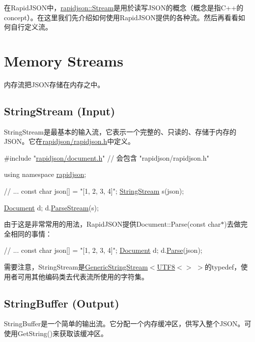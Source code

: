 在\+Rapid\+J\+S\+O\+N中，{\ttfamily \hyperlink{classrapidjson_1_1_stream}{rapidjson\+::\+Stream}}是用於读写\+J\+S\+O\+N的概念（概念是指\+C++的concept）。在这里我们先介绍如何使用\+Rapid\+J\+S\+O\+N提供的各种流。然后再看看如何自行定义流。\hypertarget{md_Commun_Externe_RapidJSON_doc_stream.zh-cn_MemoryStreams}{}\section{Memory Streams}\label{md_Commun_Externe_RapidJSON_doc_stream.zh-cn_MemoryStreams}
内存流把\+J\+S\+O\+N存储在内存之中。\hypertarget{md_Commun_Externe_RapidJSON_doc_stream.zh-cn_StringStream}{}\subsection{String\+Stream (\+Input)}\label{md_Commun_Externe_RapidJSON_doc_stream.zh-cn_StringStream}
{\ttfamily String\+Stream}是最基本的输入流，它表示一个完整的、只读的、存储于内存的\+J\+S\+O\+N。它在{\ttfamily \hyperlink{rapidjson_8h}{rapidjson/rapidjson.\+h}}中定义。


\begin{DoxyCode}
\textcolor{preprocessor}{#include "\hyperlink{document_8h}{rapidjson/document.h}"} \textcolor{comment}{// 会包含 "rapidjson/rapidjson.h"}

\textcolor{keyword}{using namespace }\hyperlink{namespacerapidjson}{rapidjson};

\textcolor{comment}{// ...}
\textcolor{keyword}{const} \textcolor{keywordtype}{char} json[] = \textcolor{stringliteral}{"[1, 2, 3, 4]"};
\hyperlink{struct_generic_string_stream}{StringStream} s(json);

\hyperlink{class_generic_document}{Document} d;
d.\hyperlink{class_generic_document_afe94c0abc83a20f2d7dc1ba7677e6238}{ParseStream}(s);
\end{DoxyCode}


由于这是非常常用的用法，\+Rapid\+J\+S\+O\+N提供{\ttfamily Document\+::\+Parse(const char$\ast$)}去做完全相同的事情：


\begin{DoxyCode}
\textcolor{comment}{// ...}
\textcolor{keyword}{const} \textcolor{keywordtype}{char} json[] = \textcolor{stringliteral}{"[1, 2, 3, 4]"};
\hyperlink{class_generic_document}{Document} d;
d.\hyperlink{class_generic_document_aebd4e7fddd80c1e1174837aee6d2159b}{Parse}(json);
\end{DoxyCode}


需要注意，{\ttfamily String\+Stream}是{\ttfamily \hyperlink{struct_generic_string_stream}{Generic\+String\+Stream}$<$\hyperlink{struct_u_t_f8}{U\+T\+F8}$<$$>$ $>$}的typedef，使用者可用其他编码类去代表流所使用的字符集。\hypertarget{md_Commun_Externe_RapidJSON_doc_stream.zh-cn_StringBuffer}{}\subsection{String\+Buffer (\+Output)}\label{md_Commun_Externe_RapidJSON_doc_stream.zh-cn_StringBuffer}
{\ttfamily String\+Buffer}是一个简单的输出流。它分配一个内存缓冲区，供写入整个\+J\+S\+O\+N。可使用{\ttfamily Get\+String()}来获取该缓冲区。


